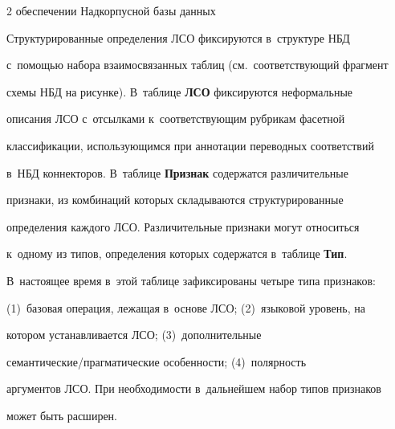\begin{multicols}{2}
{обеспечении Надкорпусной базы данных}





\vspace*{-14pt}


   


   Структурированные определения ЛСО фиксируются в~структуре НБД 


   с~по\-мощью набора взаимосвязанных таблиц (см.\ соответствующий фрагмент 


схемы НБД на рисунке). В~таблице \textbf{ЛСО} фиксируются неформальные 


описания ЛСО с~отсылками к~соответствующим рубрикам фасетной 


классификации, использующимся при аннотации переводных соответствий 


в~НБД коннекторов. В~таблице \textbf{Признак} содержатся различительные 


признаки, из комбинаций которых складываются структурированные 


определения каждого ЛСО. Различительные признаки могут относиться 


к~одному из типов, определения которых содержатся в~таблице \textbf{Тип}. 


В~настоящее время в~этой таблице зафиксированы четыре типа признаков: 


(1)~базовая операция, лежащая в~основе ЛСО; (2)~языковой уровень, на 


котором устанавливается ЛСО; (3)~дополнительные  


се\-ман\-ти\-че\-ские/праг\-ма\-ти\-че\-ские особенности; (4)~полярность 


аргументов ЛСО. При не\-об\-хо\-ди\-мости в~дальнейшем набор типов признаков 


может быть расширен.





\begin{table}\small %


\begin{center}




\vspace*{2ex}





\tabcolsep=5pt



\end{center}
\end{table}
\end{multicols}
